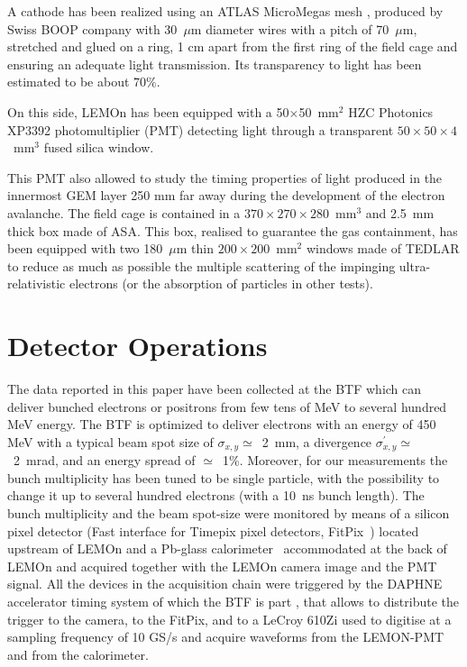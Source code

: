 \documentclass[review]{elsarticle}
\begin{document}
A  cathode has been realized using an ATLAS MicroMegas mesh \cite{bib:mesh}, produced
by Swiss BOOP company with 30~$\mu$m diameter wires with a pitch of 70~$\mu$m, stretched and glued on a ring, 1 cm apart from the first ring of the field cage and ensuring an adequate light transmission. Its transparency to light has been estimated to be about $70\%$.

On this side, LEMOn has been equipped with a 50$\times$50~mm$^2$ HZC Photonics XP3392 photomultiplier \cite{PMTPhotonics} (PMT) detecting light through a transparent $50\times50\times4$~mm$^3$ fused silica window. 


This PMT  also allowed to study 
the timing properties of light produced in the innermost GEM layer 250 mm far away during the development of the electron avalanche.  The  field cage is contained in a  $370\times270\times280$~mm$^3$ and 2.5~mm thick box made of ASA. This box, realised to guarantee the gas containment, has been equipped with two 180~$\mu$m thin $200\times200$~mm$^2$ windows made of TEDLAR to reduce as much as possible the multiple scattering of the impinging ultra-relativistic  electrons (or the absorption of particles in other tests).


\section{Detector Operations}

The data reported in this paper have been collected at the BTF which can deliver bunched electrons or positrons from few tens of MeV to several hundred MeV energy. The BTF is optimized to deliver electrons with an energy of 450 MeV with  a typical beam spot size of $\sigma_{x,y}\simeq$~2~mm, a divergence  $\sigma^\prime_{x,y}\simeq$~2~mrad, and an energy spread of $\simeq$~1\%. Moreover, for our measurements the bunch multiplicity has been tuned to be  single particle, with the possibility to change it up to several hundred  electrons (with a 10~ns bunch length). The bunch multiplicity and the beam spot-size were monitored by means of a silicon pixel detector (Fast interface for Timepix pixel detectors, FitPix~\cite{Kraus_2011}) located upstream of LEMOn  and a Pb-glass  calorimeter~\cite{Buonomo:2017sdz, Buonomo:2017btf} accommodated at the back of LEMOn and acquired together with the LEMOn camera image and the PMT signal. All the devices in the acquisition chain were triggered by the DAPHNE accelerator timing system of which the BTF is part \cite{bib:daphne_time}, that allows to distribute the trigger to the camera, 
to the FitPix, and to a LeCroy 610Zi used to digitise at a sampling frequency of 10 GS/s and acquire waveforms from the LEMON-PMT and from the calorimeter.
\end{document}
